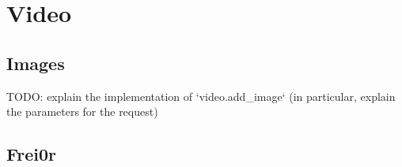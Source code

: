 \chapter{Video}
\section{Images}
TODO: explain the implementation of `video.add_image` (in particular, explain
the parameters for the request)

\section{Frei0r}
